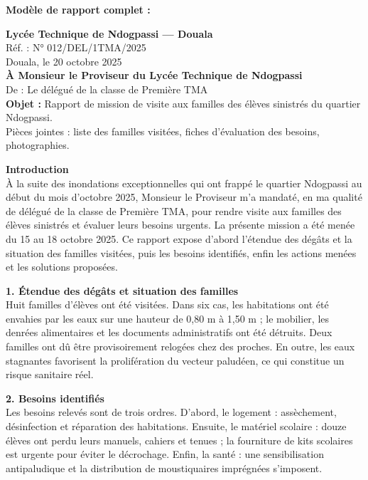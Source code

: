 \documentclass[11pt]{article}
\begin{document}
\begin{corrige}
\textbf{Modèle de rapport complet :}

\begin{center}
\textbf{Lycée Technique de Ndogpassi — Douala}\\
Réf. : N° 012/DEL/1TMA/2025\\
Douala, le 20 octobre 2025\\
\textbf{À Monsieur le Proviseur du Lycée Technique de Ndogpassi}\\
De : Le délégué de la classe de Première TMA\\
\textbf{Objet :} Rapport de mission de visite aux familles des élèves sinistrés du quartier Ndogpassi.\\
Pièces jointes : liste des familles visitées, fiches d'évaluation des besoins, photographies.
\end{center}

\textbf{Introduction}\\
À la suite des inondations exceptionnelles qui ont frappé le quartier Ndogpassi au début du mois d'octobre 2025, Monsieur le Proviseur m'a mandaté, en ma qualité de délégué de la classe de Première TMA, pour rendre visite aux familles des élèves sinistrés et évaluer leurs besoins urgents. La présente mission a été menée du 15 au 18 octobre 2025. Ce rapport expose d'abord l'étendue des dégâts et la situation des familles visitées, puis les besoins identifiés, enfin les actions menées et les solutions proposées.

\textbf{1. Étendue des dégâts et situation des familles}\\
Huit familles d'élèves ont été visitées. Dans six cas, les habitations ont été envahies par les eaux sur une hauteur de 0,80 m à 1,50 m ; le mobilier, les denrées alimentaires et les documents administratifs ont été détruits. Deux familles ont dû être provisoirement relogées chez des proches. En outre, les eaux stagnantes favorisent la prolifération du vecteur paludéen, ce qui constitue un risque sanitaire réel.

\textbf{2. Besoins identifiés}\\
Les besoins relevés sont de trois ordres. D'abord, le logement : assèchement, désinfection et réparation des habitations. Ensuite, le matériel scolaire : douze élèves ont perdu leurs manuels, cahiers et tenues ; la fourniture de kits scolaires est urgente pour éviter le décrochage. Enfin, la santé : une sensibilisation antipaludique et la distribution de moustiquaires imprégnées s'imposent.


\end{corrige}
\end{document}
